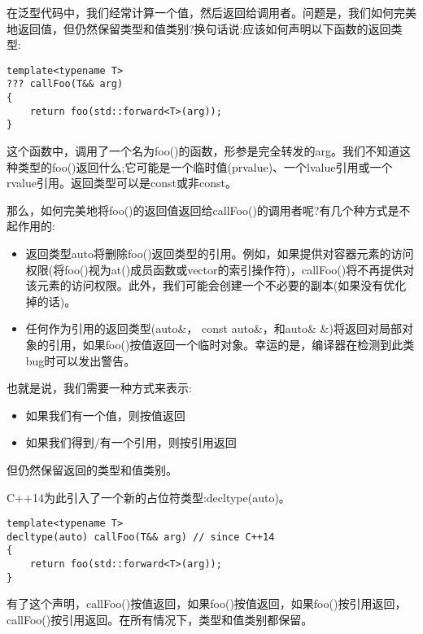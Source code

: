 在泛型代码中，我们经常计算一个值，然后返回给调用者。问题是，我们如何完美地返回值，但仍然保留类型和值类别?换句话说:应该如何声明以下函数的返回类型:\par

\begin{lstlisting}[caption={}]
template<typename T>
??? callFoo(T&& arg)
{
	return foo(std::forward<T>(arg));
}
\end{lstlisting}

这个函数中，调用了一个名为foo()的函数，形参是完全转发的arg。我们不知道这种类型的foo()返回什么;它可能是一个临时值(prvalue)、一个lvalue引用或一个rvalue引用。返回类型可以是const或非const。\par

那么，如何完美地将foo()的返回值返回给callFoo()的调用者呢?有几个种方式是不起作用的:\par

\begin{itemize}
	\item 返回类型auto将删除foo()返回类型的引用。例如，如果提供对容器元素的访问权限(将foo()视为at()成员函数或vector的索引操作符)，callFoo()将不再提供对该元素的访问权限。此外，我们可能会创建一个不必要的副本(如果没有优化掉的话)。
	\item 任何作为引用的返回类型(auto\&， const auto\&，和auto\& \&)将返回对局部对象的引用，如果foo()按值返回一个临时对象。幸运的是，编译器在检测到此类bug时可以发出警告。
\end{itemize}

也就是说，我们需要一种方式来表示:\par

\begin{itemize}
	\item 如果我们有一个值，则按值返回
	\item 如果我们得到/有一个引用，则按引用返回
\end{itemize}

但仍然保留返回的类型和值类别。\par

C++14为此引入了一个新的占位符类型:decltype(auto)。\par

\begin{lstlisting}[caption={}]
template<typename T>
decltype(auto) callFoo(T&& arg) // since C++14
{
	return foo(std::forward<T>(arg));
}
\end{lstlisting}

有了这个声明，callFoo()按值返回，如果foo()按值返回，如果foo()按引用返回，callFoo()按引用返回。在所有情况下，类型和值类别都保留。\par











































